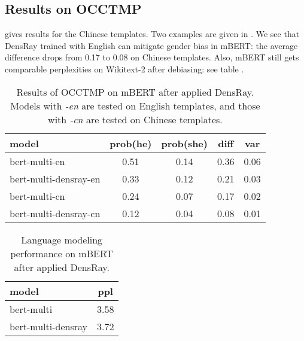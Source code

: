 \subsection{Results on OCCTMP}
 gives
results for the Chinese templates.
Two examples are given in . We see that DensRay trained with English can mitigate gender bias in mBERT: the average difference drops from 0.17 to 0.08 on Chinese templates. Also, mBERT still gets comparable perplexities on Wikitext-2 after debiasing: see table . 
\begin{table}[ht]
\centering
\footnotesize
\begin{tabular}{lcccc}
\hline
model & prob(he) & prob(she) & diff & var\\
\hline
\scriptsize bert-multi-en 
& 0.51 & 0.14 & 0.36 & 0.06 \\
\scriptsize 
bert-multi-densray-en & 0.33 & 0.12 & 0.21 & 0.03 \\
\scriptsize bert-multi-cn 
& 0.24 & 0.07 & 0.17 & 0.02 \\
\scriptsize bert-multi-densray-cn 
& 0.12 & 0.04 & 0.08 & 0.01\\
\hline
\end{tabular}
\caption{
Results of OCCTMP on mBERT after applied DensRay. Models with \textit{-en} are tested on English templates, and those with \textit{-cn} are tested on Chinese templates.}
\end{table}
\begin{table}[ht]
\centering
\footnotesize
\begin{tabular}{lc}
\hline
model & ppl\\
\hline
bert-multi & 3.58\\
bert-multi-densray & 3.72\\
\hline
\end{tabular}
\caption{
Language modeling performance on mBERT after applied DensRay. }
\end{table}
